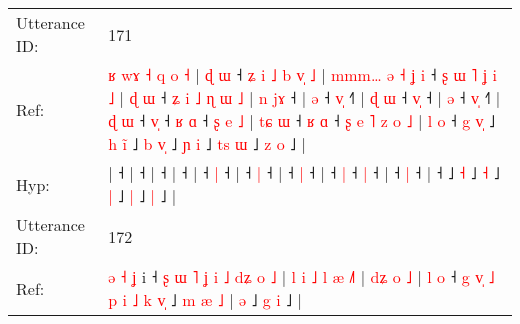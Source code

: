 \documentclass[10pt]{article}
\DeclareRobustCommand{\hl}[1]{{\textcolor{red}{#1}}}
\begin{document}
\begin{longtable}{ll}
 \\
\midrule
Utterance ID: & 171 \\
Ref: & \hl{ʁ}\hl{ }\hl{w}\hl{ɤ}\hl{ }\hl{˧}\hl{ }\hl{q}\hl{ }\hl{o}\hl{ }\hl{˧}\hl{ }|\hl{ }\hl{ɖ}\hl{ }\hl{ɯ} ˧\hl{ }\hl{ʑ}\hl{ }\hl{i}\hl{ }\hl{˩}\hl{ }\hl{b}\hl{ }\hl{v}\hl{̩}\hl{ }\hl{˩} |\hl{ }\hl{m}\hl{m}\hl{m}\hl{…}\hl{ }\hl{ə}\hl{ }\hl{˧}\hl{ }\hl{ʝ}\hl{ }\hl{i} ˧\hl{ }\hl{ʂ}\hl{ }\hl{ɯ}\hl{ }\hl{˥}\hl{ }\hl{ʝ}\hl{ }\hl{i}\hl{ }\hl{˩} |\hl{ }\hl{ɖ}\hl{ }\hl{ɯ} ˧\hl{ }\hl{ʑ}\hl{ }\hl{i}\hl{ }\hl{˩}\hl{ }\hl{ɳ}\hl{ }\hl{ɯ}\hl{ }\hl{˩} |\hl{ }\hl{n}\hl{ }\hl{j}\hl{ɤ} ˧ |\hl{ }\hl{ə} ˧ \hl{v}\hl{̩} ˧\hl{˥} |\hl{ }\hl{ɖ}\hl{ }\hl{ɯ} ˧ \hl{v}\hl{̩} ˧ |\hl{ }\hl{ə} ˧ \hl{v}\hl{̩} ˧\hl{˥} |\hl{ }\hl{ɖ}\hl{ }\hl{ɯ} ˧ \hl{v}\hl{̩} ˧\hl{ }\hl{ʁ} \hl{ɑ} ˧\hl{ }\hl{ʂ}\hl{ }\hl{e}\hl{ }\hl{˩} |\hl{ }\hl{t}\hl{ɕ}\hl{ }\hl{ɯ} ˧\hl{ }\hl{ʁ} \hl{ɑ} ˧\hl{ }\hl{ʂ}\hl{ }\hl{e}\hl{ }\hl{˥}\hl{ }\hl{z}\hl{ }\hl{o}\hl{ }\hl{˩} |\hl{ }\hl{l}\hl{ }\hl{o} ˧\hl{ }\hl{g}\hl{ }\hl{v}\hl{̩} ˩\hl{ }\hl{h} \hl{i}\hl{̃} ˩\hl{ }\hl{b} \hl{v}\hl{̩} ˩\hl{ }\hl{ɲ} \hl{i} ˩\hl{ }\hl{t}\hl{s} \hl{ɯ} ˩\hl{ }\hl{z} \hl{o} ˩ |
 \\
Hyp: & \hl{}\hl{}\hl{}\hl{}\hl{}\hl{}\hl{}\hl{}\hl{}\hl{}\hl{}\hl{}\hl{}|\hl{}\hl{}\hl{}\hl{} ˧\hl{}\hl{}\hl{}\hl{}\hl{}\hl{}\hl{}\hl{}\hl{}\hl{}\hl{}\hl{}\hl{} |\hl{}\hl{}\hl{}\hl{}\hl{}\hl{}\hl{}\hl{}\hl{}\hl{}\hl{}\hl{}\hl{} ˧\hl{}\hl{}\hl{}\hl{}\hl{}\hl{}\hl{}\hl{}\hl{}\hl{}\hl{}\hl{} |\hl{}\hl{}\hl{}\hl{} ˧\hl{}\hl{}\hl{}\hl{}\hl{}\hl{}\hl{}\hl{}\hl{}\hl{}\hl{}\hl{} |\hl{}\hl{}\hl{}\hl{}\hl{} ˧ |\hl{}\hl{} ˧ \hl{}\hl{|} ˧\hl{} |\hl{}\hl{}\hl{}\hl{} ˧ \hl{}\hl{|} ˧ |\hl{}\hl{} ˧ \hl{}\hl{|} ˧\hl{} |\hl{}\hl{}\hl{}\hl{} ˧ \hl{}\hl{|} ˧\hl{}\hl{} \hl{|} ˧\hl{}\hl{}\hl{}\hl{}\hl{}\hl{} |\hl{}\hl{}\hl{}\hl{}\hl{} ˧\hl{}\hl{} \hl{|} ˧\hl{}\hl{}\hl{}\hl{}\hl{}\hl{}\hl{}\hl{}\hl{}\hl{}\hl{}\hl{} |\hl{}\hl{}\hl{}\hl{} ˧\hl{}\hl{}\hl{}\hl{}\hl{} ˩\hl{}\hl{} \hl{}\hl{˧} ˩\hl{}\hl{} \hl{}\hl{˧} ˩\hl{}\hl{} \hl{|} ˩\hl{}\hl{}\hl{} \hl{|} ˩\hl{}\hl{} \hl{|} ˩ |
 \\
\midrule
Utterance ID: & 172 \\
Ref: & \hl{ə}\hl{ }\hl{˧}\hl{ }\hl{ʝ} i ˧\hl{ }\hl{ʂ}\hl{ }\hl{ɯ}\hl{ }\hl{˥}\hl{ }\hl{ʝ}\hl{ }\hl{i}\hl{ }\hl{˩}\hl{ }\hl{d}\hl{ʑ}\hl{ }\hl{o}\hl{ }\hl{˩} |\hl{ }\hl{l}\hl{ }\hl{i}\hl{ }\hl{˩}\hl{ }\hl{l}\hl{ }\hl{æ} \hl{˩}\hl{˥} |\hl{ }\hl{d}\hl{ʑ}\hl{ }\hl{o} \hl{˩} |\hl{ }\hl{l}\hl{ }\hl{o} ˧\hl{ }\hl{g}\hl{ }\hl{v}\hl{̩}\hl{ }\hl{˩}\hl{ }\hl{p} \hl{i} \hl{˩} \hl{k} \hl{v}\hl{̩} ˩\hl{ }\hl{m}\hl{ }\hl{æ} \hl{˩} |\hl{ }\hl{ə} ˩\hl{ }\hl{g} \hl{i} ˩ |

\end{longtable}
\end{document}
